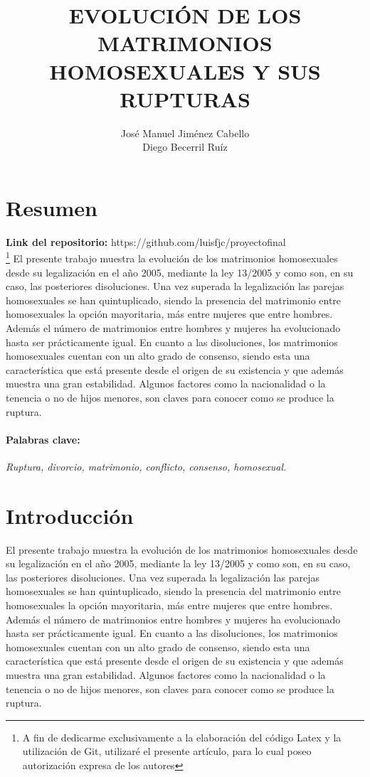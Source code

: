 \documentclass{article}
\begin{document}
	\title{\textbf{\Huge{EVOLUCIÓN DE LOS MATRIMONIOS HOMOSEXUALES Y SUS RUPTURAS}}}
	\author{José Manuel Jiménez Cabello \\ Diego Becerril Ruíz}
	\maketitle
	\newpage
	
\tableofcontents
	\newpage
	
	\section{Resumen} 
\textbf{Link del repositorio:} https://github.com/luisfjc/proyectofinal\\

	\footnote[1]{A fin de dedicarme exclusivamente a la elaboración del código Latex y la utilización de Git, utilizaré el presente artículo, para lo cual poseo autorización expresa de los autores}
El presente trabajo muestra la evolución de los matrimonios homosexuales desde su legalización en el año 2005, mediante la ley 13/2005 y como son, en su caso, las posteriores disoluciones. Una vez superada la legalización las parejas homosexuales se han quintuplicado, siendo la presencia del matrimonio entre homosexuales la opción mayoritaria, más entre mujeres que entre hombres. Además el número de matrimonios entre hombres y mujeres ha evolucionado hasta ser prácticamente igual. En cuanto a las disoluciones, los matrimonios homosexuales cuentan con un alto grado de consenso, siendo esta una característica que está presente desde el origen de su existencia y que además muestra una gran estabilidad. Algunos factores como la nacionalidad o la tenencia o no de hijos menores, son claves para conocer como se produce la ruptura.
\paragraph{Palabras clave:}
 \textit{Ruptura, divorcio, matrimonio, conflicto, consenso, homosexual.}
\section{Introducción}
El presente trabajo muestra la evolución de los matrimonios homosexuales desde su legalización en el año 2005, mediante la ley 13/2005 y como son, en su caso, las posteriores disoluciones. Una vez superada la legalización las parejas homosexuales se han quintuplicado, siendo la presencia del matrimonio entre homosexuales la opción mayoritaria, más entre mujeres que entre hombres. Además el número de matrimonios entre hombres y mujeres ha evolucionado hasta ser prácticamente igual. En cuanto a las disoluciones, los matrimonios homosexuales cuentan con un alto grado de consenso, siendo esta una característica que está presente desde el origen de su existencia y que además muestra una gran estabilidad. Algunos factores como la nacionalidad o la tenencia o no de hijos menores, son claves para conocer como se produce la ruptura.
\end{document}
